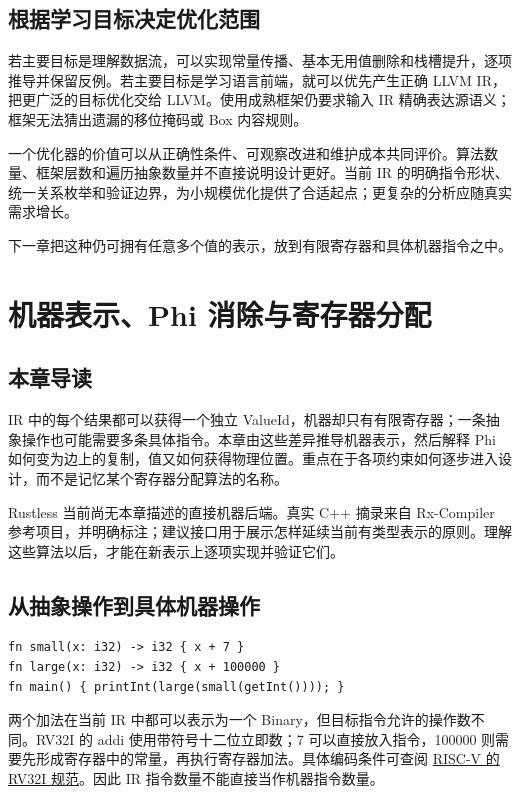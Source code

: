 \section{根据学习目标决定优化范围}
若主要目标是理解数据流，可以实现常量传播、基本无用值删除和栈槽提升，逐项推导并保留反例。若主要目标是学习语言前端，就可以优先产生正确 LLVM IR，把更广泛的目标优化交给 LLVM。使用成熟框架仍要求输入 IR 精确表达源语义；框架无法猜出遗漏的移位掩码或 Box 内容规则。

一个优化器的价值可以从正确性条件、可观察改进和维护成本共同评价。算法数量、框架层数和遍历抽象数量并不直接说明设计更好。当前 IR 的明确指令形状、统一关系枚举和验证边界，为小规模优化提供了合适起点；更复杂的分析应随真实需求增长。

下一章把这种仍可拥有任意多个值的表示，放到有限寄存器和具体机器指令之中。

\chapter{机器表示、Phi 消除与寄存器分配}
\label{chap:machine}
\section*{本章导读}
IR 中的每个结果都可以获得一个独立 ValueId，机器却只有有限寄存器；一条抽象操作也可能需要多条具体指令。本章由这些差异推导机器表示，然后解释 Phi 如何变为边上的复制，值又如何获得物理位置。重点在于各项约束如何逐步进入设计，而不是记忆某个寄存器分配算法的名称。

Rustless 当前尚无本章描述的直接机器后端。真实 C++ 摘录来自 Rx-Compiler 参考项目，并明确标注；建议接口用于展示怎样延续当前有类型表示的原则。理解这些算法以后，才能在新表示上逐项实现并验证它们。

\section{从抽象操作到具体机器操作}
\begin{lstlisting}[language=Rustless,caption={立即数大小影响机器实现路径}]
fn small(x: i32) -> i32 { x + 7 }
fn large(x: i32) -> i32 { x + 100000 }
fn main() { printInt(large(small(getInt()))); }
\end{lstlisting}
两个加法在当前 IR 中都可以表示为一个 Binary，但目标指令允许的操作数不同。RV32I 的 addi 使用带符号十二位立即数；7 可以直接放入指令，100000 则需要先形成寄存器中的常量，再执行寄存器加法。具体编码条件可查阅 \href{https://docs.riscv.org/reference/isa/v20260120/unpriv/rv32.html}{RISC-V 的 RV32I 规范}。因此 IR 指令数量不能直接当作机器指令数量。

